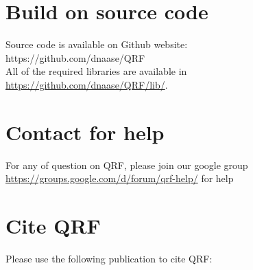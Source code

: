 \documentclass[12pt]{article}
\begin{document}
{\color{red}\section{Build on source code}}
Source code is available on Github website:\\
https://github.com/dnaase/QRF\\
All of the required libraries are available in \url{https://github.com/dnaase/QRF/lib/}.

{\color{red}\section{Contact for help}}
For any of question on QRF, please join our google group \url{https://groups.google.com/d/forum/qrf-help/} for help

{\color{red}\section{Cite QRF}}
Please use the following publication to cite QRF:
\end{document}
